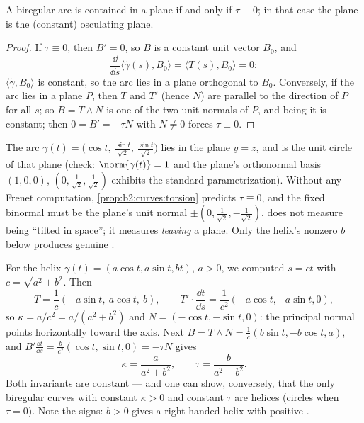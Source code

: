 \begin{proposition}\label{prop:b2:curves:torsion}
A biregular arc is contained in a plane if and only if $\tau
\equiv 0$; in that case the plane is the (constant) osculating
plane.
\end{proposition}

\begin{proof}
If $\tau \equiv 0$, then $B' = 0$, so $B$ is a constant unit
vector $B_0$, and
\[
\frac{\dd}{\dd s}\langle \tilde\gamma(s), B_0\rangle
= \langle T(s), B_0\rangle = 0 :
\]
$\langle \tilde\gamma, B_0\rangle$ is constant, so the arc lies in a plane
orthogonal to $B_0$. Conversely, if the arc lies in a plane $P$,
then $T$ and $T'$ (hence $N$) are parallel to the direction of
$P$ for all $s$; so $B = T \wedge N$ is one of the two unit
normals of $P$, and being  it is constant; then $0 = B'
= -\tau N$ with $N \neq 0$ forces $\tau \equiv 0$.
\end{proof}

\begin{example}
The arc $\gamma(t) = \bigl(\cos t,\ \tfrac{\sin t}{\sqrt2},\
\tfrac{\sin t}{\sqrt2}\bigr)$ lies in the plane $y = z$, and
is the unit circle of that plane (check: $\norm{\gamma(t)} =
1$ and the plane's orthonormal basis $(1,0,0)$,
$(0, \tfrac1{\sqrt2}, \tfrac1{\sqrt2})$ exhibits the standard
parametrization). Without any Frenet computation,
\cref{prop:b2:curves:torsion} predicts $\tau \equiv 0$, and
the fixed binormal must be the plane's unit normal $\pm(0,
\tfrac1{\sqrt2}, -\tfrac1{\sqrt2})$.  does not measure
being ``tilted in space''; it measures \emph{leaving} a
plane. Only the helix's nonzero $b$ below produces genuine
.
\end{example}

\begin{example}[The helix]\label{ex:b2:curves:helixfrenet}
For the helix $\gamma(t) = (a\cos t, a\sin t, bt)$, $a > 0$, we
computed $s = ct$ with $c = \sqrt{a^2 + b^2}$. Then
\[
T = \frac1c(-a\sin t,\ a\cos t,\ b),
\qquad
T' \cdot \frac{\dd t}{\dd s}
= \frac{1}{c^2}(-a\cos t, -a\sin t, 0),
\]
so $\kappa = a/c^2 = a/(a^2 + b^2)$ and $N = (-\cos t, -\sin t,
0)$: the principal normal points horizontally toward the axis.
Next $B = T \wedge N = \frac1c(b\sin t, -b\cos t, a)$, and $B'
\frac{\dd t}{\dd s} = \frac{b}{c^2}(\cos t, \sin t, 0) = -\tau N$
gives
\[
\boxed{\ \kappa = \frac{a}{a^2 + b^2}, \qquad
\tau = \frac{b}{a^2 + b^2}. \ }
\]
Both invariants are constant --- and one can show, conversely, that
the only biregular curves with constant $\kappa > 0$ and constant
$\tau$ are helices (circles when $\tau = 0$). Note the signs: $b >
0$ gives a right-handed helix with positive .
\end{example}

